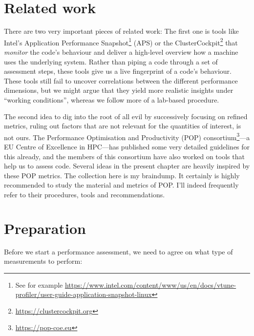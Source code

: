\section{Related work}

There are two very important pieces of related work:
The first one is tools like Intel's Application Performance Snapshot\footnote{See for example \url{https://www.intel.com/content/www/us/en/docs/vtune-profiler/user-guide-application-snapshot-linux}} (APS) or the ClusterCockpit\footnote{\url{https://clustercockpit.org}} that \emph{monitor} the code's behaviour and deliver a high-level overview how a machine uses the underlying system.
Rather than piping a code through a set of assessment steps, these tools give us a live fingerprint of a code's behaviour.
These tools still fail to uncover correlations between the different performance dimensions, but we might argue that they yield more realistic insights under ``working conditions'', whereas we follow more of a lab-based procedure.


The second idea to dig into the root of all evil by successively focusing on refined metrics, ruling out factors that are not relevant for the quantities of interest, is not ours.
The Performance Optimisation and Productivity (POP) consortium\footnote{\url{https://pop-coe.eu}}---a EU Centre of Excellence in HPC---has published some very detailed guidelines for this already, and the members of this consortium have also worked on tools that help us to assess code.
Several ideas in the present chapter are heavily inspired by these POP metrics.
The collection here is my braindump.
It certainly is highly recommended to study the material and metrics of POP.
I'll indeed frequently refer to their procedures, tools and recommendations.


\section{Preparation}
\label{section:performance-assessment:preparation}

Before we start a performance assessment, we need to agree on what type of measurements to perform:

